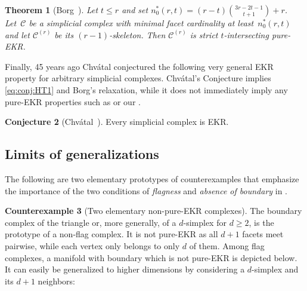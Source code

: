 \documentclass[a4paper,12pt]{amsart}
\theoremstyle{plain}
\newtheorem{theorem}{Theorem}[section]
\theoremstyle{definition}
\newtheorem{counterexample}[theorem]{Counterexample}
\newtheorem{conjecture}[theorem]{Conjecture}
\newcommand{\C}{\mathcal C}
\begin{document}
\begin{theorem}[{Borg~\cite{Bor2009}}]
\label{thm:Borg}
  Let $t \leq r$ and set $n^*_0(r,t) = (r-t)\binom{3r-2t-1}{t+1}+r$.
  Let~$\C$ be a simplicial complex with minimal facet cardinality at least~$n^*_0(r,t)$ and let $\C^{(r)}$ be its $(r-1)$-skeleton.
  Then $\C^{(r)}$ is strict $t$-intersecting pure-EKR.
\end{theorem}

Finally, 45 years ago Chv{\'a}tal conjectured the following very general EKR property for arbitrary simplicial complexes.
Chv{\'a}tal's Conjecture implies \eqref{eq:conj:HT1} and Borg's relaxation, while it does not immediately imply any pure-EKR properties such as  or our .

\begin{conjecture}[Chv{\'a}tal~\cite{Chv1974}]
  \label{chvatal}
  Every simplicial complex is EKR.
\end{conjecture}

\subsection{Limits of generalizations}
\label{ssec:limits}

The following are two elementary prototypes of counterexamples that emphasize the importance of the two conditions of \emph{flagness} and \emph{absence of boundary} in .

\begin{counterexample}[Two elementary non-pure-EKR complexes]
\label{exm:elementary}
  The boundary complex of the triangle or, more generally, of a $d$-simplex for $d\ge 2$, is the prototype of a non-flag complex.
  It is not pure-EKR as all $d+1$ facets meet pairwise, while each vertex only belongs to only $d$ of them.
  Among flag complexes, a manifold with boundary which is not pure-EKR is depicted below. It can easily be generalized to higher dimensions by considering a $d$-simplex and its $d+1$ neighbors:

  \begin{center}
  \end{center}
\end{counterexample}
\end{document}
